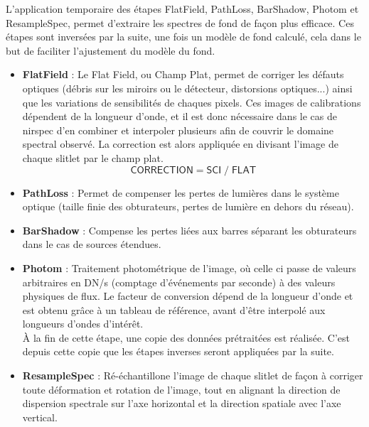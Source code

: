 \documentclass[11pt, a4paper]{article}
\begin{document}
L'application temporaire des étapes FlatField, PathLoss, BarShadow, Photom et ResampleSpec, permet d'extraire les spectres de fond de façon plus efficace. Ces étapes sont inversées par la suite, une fois un modèle de fond calculé, cela dans le but de faciliter l'ajustement du modèle du fond.

\begin{itemize}
  \item \textbf{FlatField} : Le Flat Field, ou Champ Plat, permet de corriger les défauts optiques (débris sur les miroirs ou le détecteur, distorsions optiques...) ainsi que les variations de sensibilités de chaques pixels. Ces images de calibrations dépendent de la longueur d'onde, et il est donc nécessaire dans le cas de \gls{nirspec} d'en combiner et interpoler plusieurs afin de couvrir le domaine spectral observé. La correction est alors appliquée en divisant l'image de chaque slitlet par le champ plat.
  \begin{equation}
    \mathsf{CORRECTION} = \mathsf{SCI} \; / \; \mathsf{FLAT} 
  \end{equation}

  \item \textbf{PathLoss} : Permet de compenser les pertes de lumières dans le système optique (taille finie des obturateurs, pertes de lumière en dehors du réseau).
  
  \item \textbf{BarShadow} : Compense les pertes liées aux barres séparant les obturateurs dans le cas de sources étendues.
  
  \item \textbf{Photom} : Traitement photométrique de l'image, où celle ci passe de valeurs arbitraires en DN/s (comptage d'événements par seconde) à des valeurs physiques de flux. Le facteur de conversion dépend de la longueur d'onde et est obtenu grâce à un tableau de référence, avant d'être interpolé aux longueurs d'ondes d'intérêt.\\
  
  À la fin de cette étape, une copie des données prétraitées est réalisée. C'est depuis cette copie que les étapes inverses seront appliquées par la suite.
  
  \item \textbf{ResampleSpec} : Ré-échantillone l'image de chaque slitlet de façon à corriger toute déformation et rotation de l'image, tout en alignant la direction de dispersion spectrale sur l'axe horizontal et la direction spatiale avec l'axe vertical.
\end{itemize}
\end{document}
